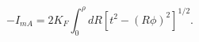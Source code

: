 \begin{equation}
\label{calaction}
-I_{mA}=2K_F\int_0^{\rho}dR[t^2-(R\phi )^2]^{1/2}.
\end{equation}

